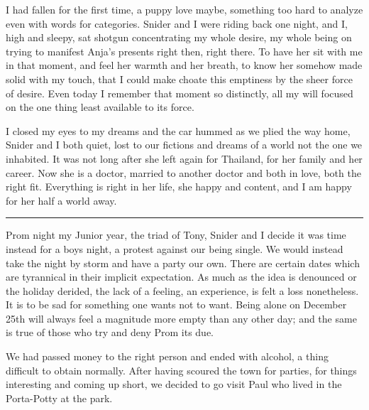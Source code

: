 \documentclass[ebook, 10pt, openright, onecolumn]{memoir}
\newcommand*\td[1]{
  \todo[inline]{
     #1 
  }
}
\newcommand*\starbreak{\fancybreak*{\Large{* * *}}}
\newcommand*\finish{\td{ ----- Finish this section -----}}
\begin{document}
\finish



I had fallen for the first time, a puppy love maybe, something too hard to
analyze even with words for categories.  Snider and I were riding back one
night, and I, high and sleepy, sat shotgun concentrating my whole desire, my
whole being on trying to manifest Anja's presents right then, right there.  To
have her sit with me in that moment, and feel her warmth and her breath, to know
her somehow made solid with my touch, that I could make choate this emptiness by
the sheer force of desire.  Even today I remember that moment so distinctly, all
my will focused on the one thing least available to its force.

I closed my eyes to my dreams and the car hummed as we plied the way home,
Snider and I both quiet, lost to our fictions and dreams of a world not the one
we inhabited.  It was not long after she left again for Thailand, for her family
and her career.  Now she is a doctor, married to another doctor and both in
love, both the right fit.  Everything is right in her life, she happy and
content, and I am happy for her half a world away.

\starbreak

Prom night my Junior year, the triad of Tony, Snider and I decide it was time
instead for a boys night, a protest against our being single.  We would instead
take the night by storm and have a party our own.  There are certain dates which
are tyrannical in their implicit expectation.  As much as the idea is denounced
or the holiday derided, the lack of a feeling, an experience, is felt a loss
nonetheless.  It is to be sad for something one wants not to want.  Being alone
on December 25th will always feel a magnitude more empty than any other day; and
the same is true of those who try and deny Prom its due.

We had passed money to the right person and ended with alcohol, a thing
difficult to obtain normally.  After having scoured the town for parties, for
things interesting and coming up short, we decided to go visit Paul who lived in
the Porta-Potty at the park.
\end{document}
